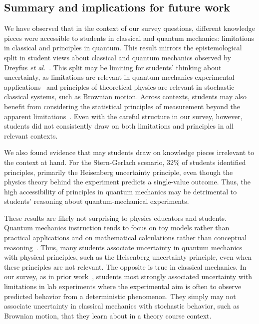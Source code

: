 \documentclass[english,aps,prstper,reprint,showpacs,longbibliography,superscriptaddress,nofootinbib]{revtex4-2}
\begin{document}
{\subsection{Summary and implications for future work}

We have observed that in the context of our survey questions, different knowledge pieces were accessible to students in classical and quantum mechanics: limitations in classical and principles in quantum. This result mirrors the epistemological split in student views about classical and quantum mechanics observed by Dreyfus \textit{et al.}~\cite{Dreyfus2019}. This split may be limiting for students' thinking about uncertainty, as limitations are relevant in quantum mechanics experimental applications~\cite{Fox2020} and principles of theoretical physics are relevant in stochastic classical systems, such as Brownian motion. Across contexts, students may also benefit from considering the statistical principles of measurement beyond the apparent limitations~\cite{Evangelinos1999,Evangelinos2002,Allie2003,Pillay2008,Buffler2008}. Even with the careful structure in our survey, however, students did not consistently draw on both limitations and  principles in all relevant contexts.

We also found evidence that may students draw on knowledge pieces irrelevant to the context at hand. For the Stern-Gerlach scenario, 32\% of students identified principles, primarily the Heisenberg uncertainty principle, even though the physics theory behind the experiment predicts a single-value outcome. Thus, the high accessibility of principles in quantum mechanics may be detrimental to students' reasoning about quantum-mechanical experiments.

These results are likely not surprising to physics educators and students. Quantum mechanics instruction tends to focus on toy models rather than practical applications and on mathematical calculations rather than conceptual reasoning~\cite{Johansson2018}. Thus, many students associate uncertainty in quantum mechanics with physical principles, such as the Heisenberg uncertainty principle, even when these principles are not relevant. 
The opposite is true in classical mechanics. In our survey, as in prior work~\cite{Sere1993,Holmes2015}, students most strongly associated uncertainty with limitations in lab experiments where the experimental aim is often to observe predicted behavior from a deterministic phenomenon. They simply may not associate uncertainty in classical mechanics with stochastic behavior, such as Brownian motion, that they learn about in a theory course context.

}
\end{document}

